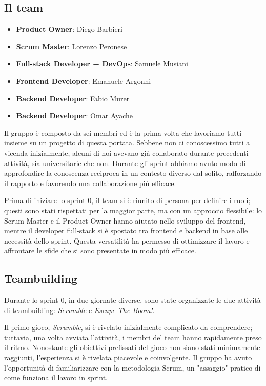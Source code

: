 \documentclass{article}
\begin{document}
\subsection{Il team}

\begin{itemize}
    \item \textbf{Product Owner}: Diego Barbieri
    \item \textbf{Scrum Master}: Lorenzo Peronese
    \item \textbf{Full-stack Developer + DevOps}: Samuele Musiani
    \item \textbf{Frontend Developer}: Emanuele Argonni
    \item \textbf{Backend Developer}: Fabio Murer
    \item \textbf{Backend Developer}: Omar Ayache
\end{itemize}

Il gruppo è composto da sei membri ed è la prima volta che lavoriamo tutti insieme su un progetto di questa portata. Sebbene non ci 
conoscessimo tutti a vicenda inizialmente, alcuni di noi avevano già collaborato durante precedenti attività, sia universitarie 
che non. Durante gli sprint abbiamo avuto modo di approfondire la conoscenza reciproca in un contesto diverso dal solito, rafforzando 
il rapporto e favorendo una collaborazione più efficace.

Prima di iniziare lo sprint 0, il team si è riunito di persona per definire i ruoli; questi sono stati rispettati per la maggior parte, 
ma con un approccio flessibile: lo Scrum Master e il Product Owner hanno aiutato nello sviluppo del frontend, mentre il developer full-stack
si è spostato tra frontend e backend in base alle necessità dello sprint. Questa versatilità ha permesso di ottimizzare il lavoro 
e affrontare le sfide che si sono presentate in modo più efficace.

\subsection{Teambuilding} \label{sec:teambuilding}

Durante lo sprint 0, in due giornate diverse, sono state organizzate le due attività di teambuilding: \textit{Scrumble} e 
\textit{Escape The Boom!}.

Il primo gioco, \textit{Scrumble}, si è rivelato inizialmente complicato da comprendere; tuttavia, una volta avviata l'attività, i membri 
del team hanno rapidamente preso il ritmo. Nonostante gli obiettivi prefissati del gioco non siano stati minimamente raggiunti, l'esperienza 
si è rivelata piacevole e coinvolgente. Il gruppo ha avuto l'opportunità di familiarizzare con la metodologia Scrum, un "assaggio" pratico 
di come funziona il lavoro in sprint.
\end{document}
